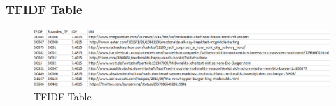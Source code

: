 \subsubsection{TFIDF Table}
\begin{figure}[ht]    
    \begin{center}
        \includegraphics[scale=0.6]{Tfidf_table.png}
        \caption{TFIDF Table}
        \label{TFIDF Table}
    \end{center}
\end{figure}
\newpage

